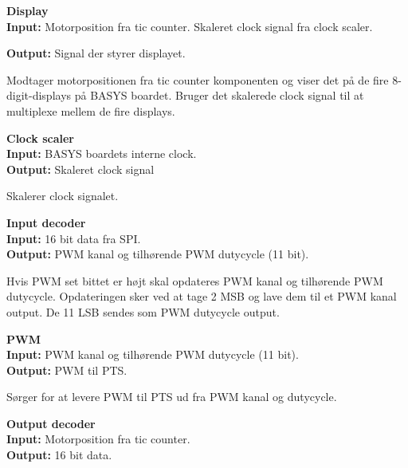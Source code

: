 \textbf{Display}\\
\textbf{Input:} Motorposition fra tic counter. Skaleret clock signal fra clock 
scaler.

\textbf{Output:} Signal der styrer displayet.

Modtager motorpositionen fra tic counter komponenten og viser det på de fire 8-digit-displays 
på BASYS boardet. Bruger det skalerede clock signal til at multiplexe mellem de 
fire displays.

\textbf{Clock scaler}\\
\textbf{Input:} BASYS boardets interne clock.\\
\textbf{Output:} Skaleret clock signal

Skalerer clock signalet.

\textbf{Input decoder}\\
\textbf{Input:} 16 bit data fra SPI.\\
\textbf{Output:} PWM kanal og tilhørende PWM dutycycle (11 bit).

Hvis PWM set bittet er højt skal opdateres PWM kanal og tilhørende PWM dutycycle.
Opdateringen sker ved at tage 2 MSB og lave dem til et PWM kanal output. De 11 
LSB sendes som PWM dutycycle output.

\textbf{PWM}\\
\textbf{Input:} PWM kanal og tilhørende PWM dutycycle (11 bit).\\
\textbf{Output:} PWM til PTS.

Sørger for at levere PWM til PTS ud fra PWM kanal og dutycycle.

\textbf{Output decoder}\\
\textbf{Input:} Motorposition fra tic counter.\\
\textbf{Output:} 16 bit data.

